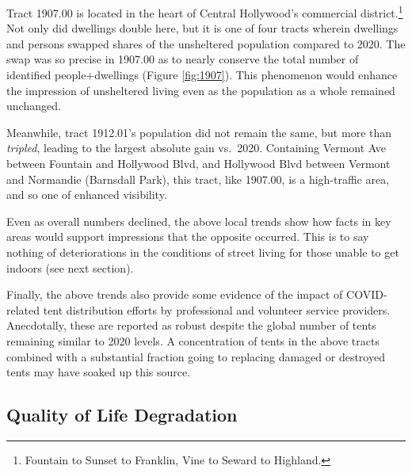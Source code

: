 \documentclass[11pt,twocolumn]{article}
\begin{document}
Tract 1907.00 is located in the heart of Central Hollywood's commercial district.\footnote{Fountain to Sunset to Franklin, 
Vine to Seward to Highland.}  Not only did dwellings double here, but it is one of four tracts wherein dwellings
and persons swapped shares of the unsheltered population compared to 2020. The swap was so precise in 1907.00
as to nearly conserve the total number of identified people+dwellings (Figure \ref{fig:1907}). This phenomenon would 
enhance the impression of unsheltered living even as the population as a whole remained unchanged.

Meanwhile, tract 1912.01's population did not remain the same, but more than {\it tripled}, leading to the largest 
absolute gain vs.~2020. Containing Vermont Ave between Fountain and Hollywood Blvd, and Hollywood Blvd between 
Vermont and Normandie (Barnsdall Park), this tract, like 1907.00, is a high-traffic area, and so one of enhanced visibility. 

Even as overall numbers declined, the above local trends show how facts in key areas would support impressions
that the opposite occurred. This is to say nothing of deteriorations in the conditions of street living
for those unable to get indoors (see next section).

Finally, the above trends also provide some evidence of the impact of COVID-related tent distribution efforts 
by professional and volunteer service providers. Anecdotally, these are reported as robust despite the global 
number of tents remaining similar to 2020 levels. A concentration of tents in the above tracts combined with a 
substantial fraction going to replacing damaged or destroyed tents may have soaked up this source.



\subsection{Quality of Life Degradation}
\end{document}
